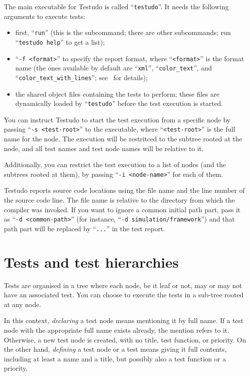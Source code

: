 \documentclass[twoside, a4paper, article]{memoir}
\begin{document}
The main executable for Testudo is called ``\texttt{testudo}''.  It needs the
following arguments to execute tests:
\begin{itemize}
\item first, ``\texttt{run}'' (this is the subcommand; there are other
  subcommands; run ``\texttt{testudo help}'' to get a list);
\item ``\texttt{-f <format>}'' to specify the report format, where
  ``\texttt{<format>}'' is the format name (the ones available by default are
  ``\texttt{xml}'', ``\texttt{color\_text}'', and
  ``\texttt{color\_text\_with\_lines}''; see~ for
  details);
\item the shared object files containing the tests to perform; these files are
  dynamically loaded by ``\texttt{testudo}'' before the test execution is
  started.
\end{itemize}

You can instruct Testudo to start the test execution from a specific node by
passing ``\texttt{-s <test-root>}'' to the executable, where
``\texttt{<test-root>}'' is the full name for the node.  The execution will be
restritced to the subtree rooted at the node, and all test names and test node
names will be relative to it.

Additionally, you can restrict the test execution to a list of nodes (and the
subtrees rooted at them), by passing ``\texttt{-i <node-name>}'' for each of
them.

Testudo reports source code locations using the file name and the line number
of the source code line.  The file name is relative to the directory from which
the compiler was invoked.  If you want to ignore a common initial path part,
pass it as ``\texttt{-d <common-path>}'' (for instance, ``\texttt{-d
  simulation/framework}'') and that path part will be replaced by
``\texttt{...}''  in the test report.


\chapter{Tests and test hierarchies}
\label{cha:tests-test-hierarchies}

Tests are organised in a tree where each node, be it leaf or not, may or may
not have an associated test.  You can choose to execute the tests in a sub-tree
rooted at any node.

In this context, \emph{declaring} a test node means mentioning it by full name.
If a test node with the appropriate full name exists already, the mention
refers to it.  Otherwise, a new test node is created, with no title, test
function, or priority.  On the other hand, \emph{defining} a test node or a
test means giving it full contents, including at least a name and a title, but
possibly also a test function or a priority.
\end{document}
